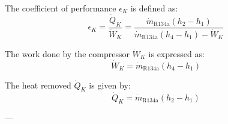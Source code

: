 The coefficient of performance \( \epsilon_K \) is defined as:  
\[
\epsilon_K = \frac{\dot{Q}_K}{\dot{W}_K} = \frac{\dot{m}_{\text{R134a}} (h_2 - h_1)}{\dot{m}_{\text{R134a}} (h_4 - h_1) - \dot{W}_K}
\]  

The work done by the compressor \( \dot{W}_K \) is expressed as:  
\[
\dot{W}_K = \dot{m}_{\text{R134a}} (h_4 - h_1)
\]  

The heat removed \( \dot{Q}_K \) is given by:  
\[
\dot{Q}_K = \dot{m}_{\text{R134a}} (h_2 - h_1)
\]  

---